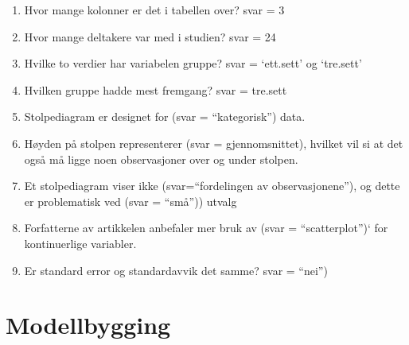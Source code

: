 \documentclass[
]{book}
\providecommand{\tightlist}{%
  \setlength{\itemsep}{0pt}\setlength{\parskip}{0pt}}
\begin{document}
\begin{enumerate}
\def\labelenumi{\alph{enumi}.}
\tightlist
\item
  Hvor mange kolonner er det i tabellen over? svar = 3
\item
  Hvor mange deltakere var med i studien? svar = 24
\item
  Hvilke to verdier har variabelen gruppe? svar = `ett.sett' og `tre.sett'
\item
  Hvilken gruppe hadde mest fremgang? svar = tre.sett
\item
  Stolpediagram er designet for (svar = ``kategorisk'') data.
\item
  Høyden på stolpen representerer (svar = gjennomsnittet), hvilket vil si at det også må ligge noen observasjoner over og under stolpen.
\item
  Et stolpediagram viser ikke (svar=``fordelingen av observasjonene''), og dette er problematisk ved (svar = ``små'')) utvalg
\item
  Forfatterne av artikkelen anbefaler mer bruk av (svar = ``scatterplot'')` for kontinuerlige variabler.
\item
  Er standard error og standardavvik det samme? svar = ``nei'')
\end{enumerate}

\hypertarget{modellbygging}{%
\section{Modellbygging}\label{modellbygging}}
\end{document}
